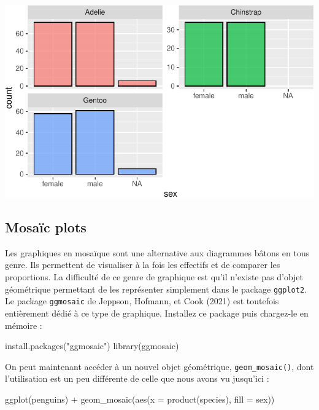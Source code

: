 \documentclass[
  a4paper,
  DIV=11,
  numbers=noendperiod,
  oneside]{scrreprt}
\newenvironment{Shaded}{}{}
\newcommand{\AttributeTok}[1]{\textcolor[rgb]{0.84,0.23,0.29}{#1}}
\newcommand{\FunctionTok}[1]{\textcolor[rgb]{0.44,0.26,0.76}{#1}}
\newcommand{\NormalTok}[1]{\textcolor[rgb]{0.14,0.16,0.18}{#1}}
\newcommand{\SpecialCharTok}[1]{\textcolor[rgb]{0.00,0.36,0.77}{#1}}
\newcommand{\StringTok}[1]{\textcolor[rgb]{0.01,0.18,0.38}{#1}}
\begin{document}
\includegraphics{03-visualization_files/figure-pdf/unnamed-chunk-64-1.pdf}

\subsection{Mosaïc plots}\label{sec-mosa}

Les graphiques en mosaïque sont une alternative aux diagrammes bâtons en
tous genre. Ils permettent de visualiser à la fois les effectifs et de
comparer les proportions. La difficulté de ce genre de graphique est
qu'il n'existe pas d'objet géométrique permettant de les représenter
simplement dans le package \texttt{ggplot2}. Le package
\texttt{ggmosaic} de Jeppson, Hofmann, et Cook (2021) est toutefois
entièrement dédié à ce type de graphique. Installez ce package puis
chargez-le en mémoire :

\begin{Shaded}
\begin{Highlighting}[]
\FunctionTok{install.packages}\NormalTok{(}\StringTok{"ggmosaic"}\NormalTok{)}
\FunctionTok{library}\NormalTok{(ggmosaic)}
\end{Highlighting}
\end{Shaded}

On peut maintenant accéder à un nouvel objet géométrique,
\texttt{geom\_mosaic()}, dont l'utilisation est un peu différente de
celle que nous avons vu jusqu'ici :

\begin{Shaded}
\begin{Highlighting}[]
\FunctionTok{ggplot}\NormalTok{(penguins) }\SpecialCharTok{+}
  \FunctionTok{geom\_mosaic}\NormalTok{(}\FunctionTok{aes}\NormalTok{(}\AttributeTok{x =} \FunctionTok{product}\NormalTok{(species), }\AttributeTok{fill =}\NormalTok{ sex))}
\end{Highlighting}
\end{Shaded}
\end{document}
